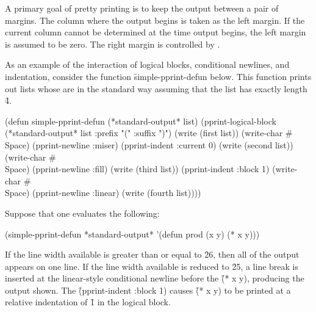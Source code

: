 \endsubsubsection%


A primary goal of pretty printing is to keep the output between a pair of
margins. 
The column where the output begins is taken as the left margin.
If the current column cannot be determined at the time output begins,
the left margin is assumed to be zero.
The right margin is controlled by .

\endsubsubsection%

\endsubSection%


As an example of the interaction of logical blocks, conditional newlines,
and indentation, consider the function \f{simple-pprint-defun} below.  This
function prints out lists whose  are  in the 
standard way assuming that the list has exactly length \f{4}.
 
\code
(defun simple-pprint-defun (*standard-output* list)
  (pprint-logical-block (*standard-output* list :prefix "(" :suffix ")")
    (write (first list))
    (write-char #\\Space)
    (pprint-newline :miser)
    (pprint-indent :current 0)
    (write (second list))
    (write-char #\\Space)
    (pprint-newline :fill)
    (write (third list))
    (pprint-indent :block 1)
    (write-char #\\Space)
    (pprint-newline :linear)
    (write (fourth list))))
\endcode

Suppose that one evaluates the following:

\code
(simple-pprint-defun *standard-output* '(defun prod (x y) (* x y)))
\endcode
 
If the line width available is greater than or equal to \f{26}, then all of the
output appears on one line.  If the line width available is reduced to \f{25},
a line break is inserted at the linear-style conditional newline before the
 \f{(* x y)}, producing the output shown.  The
\f{(pprint-indent :block 1)} causes \f{(* x y)} to be printed at a relative
indentation of \f{1} in the logical block.
 
